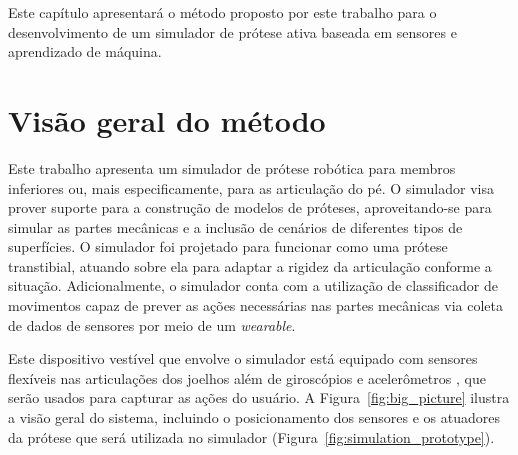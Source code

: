 Este capítulo apresentará o método proposto por este trabalho para o desenvolvimento de um simulador de prótese ativa baseada em sensores e aprendizado de máquina.

\section{Visão geral do método}\label{sec:metodo_protese}

Este trabalho apresenta um simulador de prótese robótica para membros inferiores ou, mais especificamente, para as articulação do pé. 
O simulador visa prover suporte para a construção de modelos de próteses,  
aproveitando-se para simular as partes mecânicas e a inclusão de cenários de diferentes tipos de superfícies.
O simulador foi projetado para funcionar como uma prótese transtibial, atuando sobre ela para adaptar a rigidez da articulação conforme a situação. Adicionalmente, o simulador conta com a utilização de classificador de movimentos capaz de prever as ações necessárias nas partes mecânicas via coleta de dados de sensores por meio de um \textit{wearable}.

Este dispositivo vestível que envolve o simulador está equipado com sensores flexíveis \cite{flex:datasheet} nas articulações dos joelhos além de giroscópios e acelerômetros \cite{invensense:imu_mpu}, que serão usados para capturar as ações do usuário. A Figura~\ref{fig:big_picture} ilustra a visão geral do sistema, incluindo o posicionamento dos sensores e os atuadores da prótese que será utilizada no simulador (Figura~\ref{fig:simulation_prototype}).


